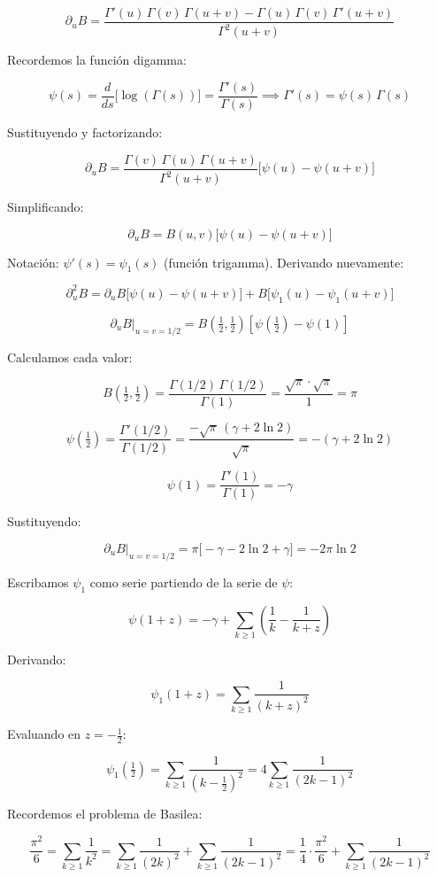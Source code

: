 \documentclass[a4paper]{article}
\begin{document}
$$\partial_u B = \frac{\Gamma'(u)\,\Gamma(v)\,\Gamma(u+v) - \Gamma(u)\,\Gamma(v)\,\Gamma'(u+v)}{\Gamma^2(u+v)}$$

Recordemos la función digamma:

$$\psi(s) = \frac{d}{ds}\big[\log(\Gamma(s))\big] = \frac{\Gamma'(s)}{\Gamma(s)} \implies \Gamma'(s) = \psi(s)\,\Gamma(s)$$

Sustituyendo y factorizando:

$$\partial_u B = \frac{\Gamma(v)\,\Gamma(u)\,\Gamma(u+v)}{\Gamma^2(u+v)}\big[\psi(u) - \psi(u+v)\big]$$

Simplificando:

$$\partial_u B = B(u,v)\big[\psi(u) - \psi(u+v)\big]$$

Notación: $\psi'(s) = \psi_1(s)$ (función trigamma). Derivando nuevamente:

$$\partial_u^2 B = \partial_u B\big[\psi(u) - \psi(u+v)\big] + B\big[\psi_1(u) - \psi_1(u+v)\big]$$

$$\partial_u B\Big|_{u=v=1/2} = B\!\left(\tfrac{1}{2},\tfrac{1}{2}\right)\left[\psi\!\left(\tfrac{1}{2}\right) - \psi(1)\right]$$

Calculamos cada valor:

$$B\!\left(\tfrac{1}{2},\tfrac{1}{2}\right) = \frac{\Gamma(1/2)\,\Gamma(1/2)}{\Gamma(1)} = \frac{\sqrt{\pi}\cdot\sqrt{\pi}}{1} = \pi$$

$$\psi\!\left(\tfrac{1}{2}\right) = \frac{\Gamma'(1/2)}{\Gamma(1/2)} = \frac{-\sqrt{\pi}\,(\gamma + 2\ln 2)}{\sqrt{\pi}} = -(\gamma + 2\ln 2)$$

$$\psi(1) = \frac{\Gamma'(1)}{\Gamma(1)} = -\gamma$$

Sustituyendo:

$$\partial_u B\Big|_{u=v=1/2} = \pi\big[-\gamma - 2\ln 2 + \gamma\big] = -2\pi\ln 2$$

Escribamos $\psi_1$ como serie partiendo de la serie de $\psi$:

$$\psi(1+z) = -\gamma + \sum_{k\geq 1}\left(\frac{1}{k} - \frac{1}{k+z}\right)$$

Derivando:

$$\psi_1(1+z) = \sum_{k\geq 1}\frac{1}{(k+z)^2}$$

Evaluando en $z = -\tfrac{1}{2}$:

$$\psi_1\!\left(\tfrac{1}{2}\right) = \sum_{k\geq 1}\frac{1}{\left(k - \tfrac{1}{2}\right)^2} = 4\sum_{k\geq 1}\frac{1}{(2k-1)^2}$$

Recordemos el problema de Basilea:

$$\frac{\pi^2}{6} = \sum_{k\geq 1}\frac{1}{k^2} = \sum_{k\geq 1}\frac{1}{(2k)^2} + \sum_{k\geq 1}\frac{1}{(2k-1)^2} = \frac{1}{4}\cdot\frac{\pi^2}{6} + \sum_{k\geq 1}\frac{1}{(2k-1)^2}$$
\end{document}
